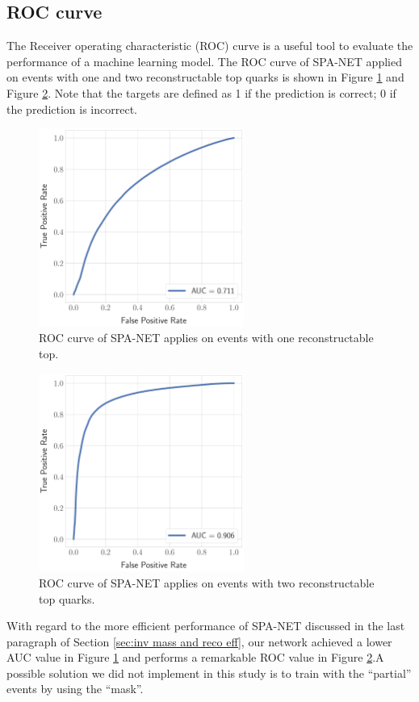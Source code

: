 \subsection{ROC curve}\label{sebsec:roc}
The Receiver operating characteristic (ROC) curve is a useful tool to evaluate the performance of a machine learning model. The ROC curve of SPA-NET applied on events with one and two reconstructable top quarks is shown in Figure \ref{fig: roc one top} and Figure \ref{fig: roc two top}. Note that the targets are defined as 1 if the prediction is correct; 0 if the prediction is incorrect.
\\
 \begin{figure}[H]
 	\centering
 	\includegraphics[width=0.6\textwidth]{Figures/roc_one_quark.pdf}
 	\caption{ ROC curve of SPA-NET applies on events with one reconstructable top.}
 	\label{fig: roc one top}
 \end{figure}
 \begin{figure}[H]
 	\centering
 	\includegraphics[width=0.6\textwidth]{Figures/roc_two_quark.pdf}
 	\caption{ ROC curve of SPA-NET applies on events with two reconstructable top quarks.}
 	\label{fig: roc two top}
 \end{figure}
\newpage
With regard to the more efficient performance of SPA-NET discussed in the last paragraph of Section \ref{sec:inv mass and reco eff}, our network achieved a lower AUC value in Figure \ref{fig: roc one top} and performs a remarkable ROC value in Figure \ref{fig: roc two top}.A possible solution we did not implement in this study is to train with the ``partial'' events by using the ``mask''\cite{Fenton:2020woz}\cite{Shmakov:2021qdz}.
